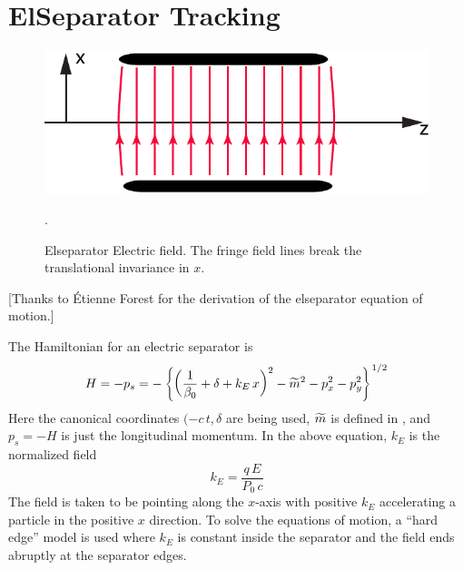 



\section{ElSeparator Tracking}
\label{s:elsep.std}

\begin{figure}[tb]
  \centering
  \includegraphics[width=5in]{elseparator.pdf}
  \caption[ElSeparator electric field.]
  {
Elseparator Electric field. The fringe field lines break the
translational invariance in $x$.
  }
  \label{f:elsep}.
\end{figure}

[Thanks to \'Etienne Forest for the derivation of the elseparator equation of motion.]

The Hamiltonian for an electric separator is 
\begin{equation}
  H = -p_s 
  = - \left\{ \left( \frac{1}{\beta_0} + \delta + k_E \, x \right)^2 - 
  \widetilde m^2 - p_x^2 - p_y^2 \right\}^{1/2}
  \label{hp1b}
\end{equation}
Here the canonical coordinates $(-c \, t, \delta$ are being used,
$\widetilde m$ is defined in , and $p_s = -H$ is just the
longitudinal momentum.  In the above equation, $k_E$ is the normalized
field
\begin{equation}
  k_E = \frac{q \, E}{P_0 \, c}
\end{equation}
The field is taken to be pointing along the $x$-axis with positive
$k_E$ accelerating a particle in the positive $x$ direction. To solve
the equations of motion, a ``hard edge'' model is used where $k_E$ is
constant inside the separator and the field ends abruptly at the
separator edges.

